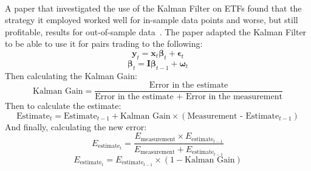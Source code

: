 \\[5mm]
A paper that investigated the use of the Kalman Filter on ETFs found that the strategy it employed worked well for in-sample data points and worse, but still profitable, results for out-of-sample data~\cite{dempsey_market_2017}. The paper adapted the Kalman Filter to be able to use it for pairs trading to the following: $$\mathbf{y}_t = \mathbf{x}_t \mathbf{\beta}_t + \mathbf{\epsilon}_t$$ $$\mathbf{\beta}_t = \mathbf{I} \mathbf{\beta}_{t-1} + \mathbf{\omega}_t$$ Then calculating the Kalman Gain: $$\text{Kalman Gain} = \frac{\text{Error in the estimate}}{\text{Error in the estimate + Error in the measurement}}$$ Then to calculate the estimate: $$\text{Estimate}_t = \text{Estimate}_{t-1} + \text{Kalman Gain} \times (\text{Measurement - }\text{Estimate}_{t-1})$$ And finally, calculating the new error: $$E_{\text{estimate}_t} = \frac{E_{\text{measurement}} \times E_{\text{estimate}_{t-1}}}{E_{\text{measurement}} + E_{\text{estimate}_{t-1}}}$$ $$E_{\text{estimate}_t} = E_{\text{estimate}_{t-1}} \times (1 - \text{Kalman Gain})$$

